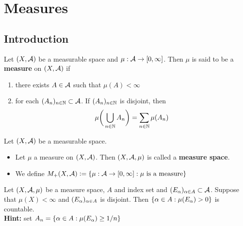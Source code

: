 \documentclass{book}
\begin{document}
	
	
	
	
	
	
	
	
	
	
	
	
	
	
	
	
	
	
	
	
	
	
	
	
	
	
	
	
	
	
	
	
	
	
	\newpage
	\chapter{Measures}
	
	\section{Introduction}
	
	\begin{defn} 
		Let $(X, \mathcal{A})$ be a measurable space and $\mu:\mathcal{A} \rightarrow [0,\infty]$. Then $\mu$ is said to be a \textbf{measure} on $(X, \mathcal{A})$ if 
		\begin{enumerate}
			\item there exists $A \in \mathcal{A}$ such that $\mu(A)< \infty$
			\item for each $(A_n)_{n \in \mathbb{N}} \subset \mathcal{A}$. If $(A_n)_{n \in \mathbb{N}}$ is disjoint, then $$\mu\bigg(\bigcup_{n \in \mathbb{N}}A_n \bigg) = \sum_{n \in \mathbb{N}}\mu(A_n)$$
		\end{enumerate}
	\end{defn}
	
	\begin{defn} 
		Let $(X,\mathcal{A})$ be a measurable space. 
		\begin{itemize}
			\item Let $\mu$ a measure on $(X, \mathcal{A})$. Then $(X, \mathcal{A}, \mu)$ is called a \textbf{measure space}. 
			\item We define $M_+(X, \mathcal{A}) \vcentcolon= \{\mu: \mathcal{A} \rightarrow [0,\infty]: \mu \text{ is a measure}\}$
		\end{itemize}
	\end{defn}
	
	\begin{ex} 
	Let $(X, \mathcal{A}, \mu)$ be a measure space, $A$ and index set and $(E_{\alpha})_{\alpha \in A} \subset \mathcal{A}$. Suppose that $\mu(X) < \infty$ and $(E_\alpha)_{\alpha \in A }$ is disjoint. Then $\{\alpha \in A: \mu(E_{\alpha}) >0\}$ is countable.\\
	\textbf{Hint:} set $A_n = \{\alpha \in A: \mu(E_{\alpha}) \geq 1/n \}$ 
	\end{ex}
	
\end{document}
